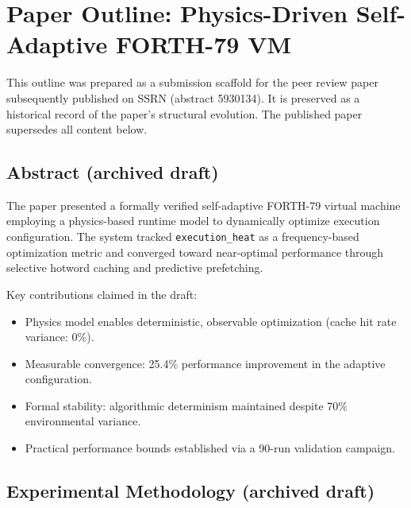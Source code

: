 
\section{Paper Outline: Physics-Driven Self-Adaptive FORTH-79 VM}

This outline was prepared as a submission scaffold for the peer review paper
subsequently published on SSRN (abstract 5930134). It is preserved as a
historical record of the paper's structural evolution. The published paper
supersedes all content below.

\subsection{Abstract (archived draft)}

The paper presented a formally verified self-adaptive FORTH-79 virtual machine
employing a physics-based runtime model to dynamically optimize execution
configuration. The system tracked \texttt{execution\_heat} as a
frequency-based optimization metric and converged toward near-optimal
performance through selective hotword caching and predictive prefetching.

Key contributions claimed in the draft:
\begin{itemize}
  \item Physics model enables deterministic, observable optimization
        (cache hit rate variance: 0\%).
  \item Measurable convergence: 25.4\% performance improvement in the
        adaptive configuration.
  \item Formal stability: algorithmic determinism maintained despite 70\%
        environmental variance.
  \item Practical performance bounds established via a 90-run validation
        campaign.
\end{itemize}

\subsection{Experimental Methodology (archived draft)}


